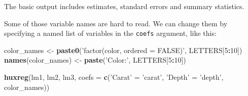 \documentclass[]{article}
\newenvironment{Shaded}{\begin{snugshade}}{\end{snugshade}}
\newcommand{\DataTypeTok}[1]{\textcolor[rgb]{0.13,0.29,0.53}{#1}}
\newcommand{\DecValTok}[1]{\textcolor[rgb]{0.00,0.00,0.81}{#1}}
\newcommand{\KeywordTok}[1]{\textcolor[rgb]{0.13,0.29,0.53}{\textbf{#1}}}
\newcommand{\NormalTok}[1]{#1}
\newcommand{\OperatorTok}[1]{\textcolor[rgb]{0.81,0.36,0.00}{\textbf{#1}}}
\newcommand{\StringTok}[1]{\textcolor[rgb]{0.31,0.60,0.02}{#1}}
\begin{document}
\FloatBarrier

The basic output includes estimates, standard errors and summary
statistics.

Some of those variable names are hard to read. We can change them by
specifying a named list of variables in the \texttt{coefs} argument,
like this:

\begin{Shaded}
\begin{Highlighting}[]
\NormalTok{color_names <-}\StringTok{ }\KeywordTok{paste0}\NormalTok{(}\StringTok{'factor(color, ordered = FALSE)'}\NormalTok{, LETTERS[}\DecValTok{5}\OperatorTok{:}\DecValTok{10}\NormalTok{])}
\KeywordTok{names}\NormalTok{(color_names) <-}\StringTok{ }\KeywordTok{paste}\NormalTok{(}\StringTok{'Color:'}\NormalTok{, LETTERS[}\DecValTok{5}\OperatorTok{:}\DecValTok{10}\NormalTok{])}

\KeywordTok{huxreg}\NormalTok{(lm1, lm2, lm3, }\DataTypeTok{coefs =} \KeywordTok{c}\NormalTok{(}\StringTok{'Carat'}\NormalTok{ =}\StringTok{ 'carat'}\NormalTok{, }\StringTok{'Depth'}\NormalTok{ =}\StringTok{ 'depth'}\NormalTok{, color_names))}
\end{Highlighting}
\end{Shaded}

 
  \providecommand{\huxb}[2]{\arrayrulecolor[RGB]{#1}\global\arrayrulewidth=#2pt}
  \providecommand{\huxvb}[2]{\color[RGB]{#1}\vrule width #2pt}
  \providecommand{\huxtpad}[1]{\rule{0pt}{\baselineskip+#1}}
  \providecommand{\huxbpad}[1]{\rule[-#1]{0pt}{#1}}
\end{document}
